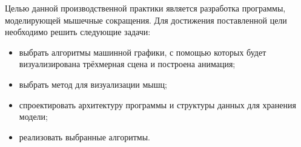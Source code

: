 \Introduction

Целью данной производственной практики является разработка программы, моделирующей мышечные сокращения. Для достижения поставленной цели необходимо решить следующие задачи:

\begin{itemize}
	\item выбрать алгоритмы машинной графики, с помощью которых будет визуализирована трёхмерная сцена и построена анимация;
	\item выбрать метод для визуализации мышц;
	\item спроектировать архитектуру программы и структуры данных для хранения модели;
	\item реализовать выбранные алгоритмы.
\end{itemize}